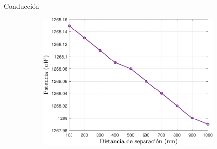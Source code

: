 \documentclass[spanish,a4paper]{beamer}%
\begin{document}
\begin{frame}{Conducción}
\begin{figure}[h]
\begin{subfigure}[b]{0.48\textwidth}
				\end{subfigure}\hfill
				\begin{subfigure}[b]{0.48\textwidth}\centering
					\includegraphics[width=.8\textwidth]{Prc_SsSiO2Ge_Max}%
				\end{subfigure}
			\label{}%
			\end{figure}					
		\end{frame}
\end{document}
